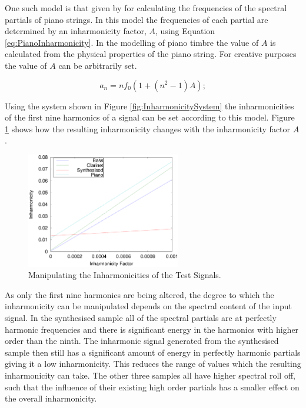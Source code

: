 			One such model is that given by \citet{rossing2002the} for calculating the frequencies of the
			spectral partials of piano strings. In this model the frequencies of each partial are determined by
			an inharmonicity factor, $A$, using Equation \ref{eq:PianoInharmonicity}. In the modelling of piano
			timbre the value of $A$ is calculated from the physical properties of the piano string. For
			creative purposes the value of $A$ can be arbitrarily set.

			\begin{equation}
				a_{n} = nf_{0} \left( 1 + \left( n^{2} - 1 \right) A \right);
				\label{eq:PianoInharmonicity}
			\end{equation}

			Using the system shown in Figure \ref{fig:InharmonicitySystem} the inharmonicities of the first
			nine harmonics of a signal can be set according to this model. Figure \ref{fig:MoveInharmonicities}
			shows how the resulting inharmonicity changes with the inharmonicity factor $A$.

			\begin{figure}[h!]
				\centering
				\includegraphics[width=0.6\textwidth]{chapter6/Images/MoveInharmonicities.eps}
				\caption{Manipulating the Inharmonicities of the Test Signals.}
				\label{fig:MoveInharmonicities}
			\end{figure}

			As only the first nine harmonics are being altered, the degree to which the inharmonicity can be
			manipulated depends on the spectral content of the input signal. In the synthesised sample all of
			the spectral partials are at perfectly harmonic frequencies and there is significant energy in the
			harmonics with higher order than the ninth. The inharmonic signal generated from the synthesised
			sample then still has a significant amount of energy in perfectly harmonic partials giving it a low
			inharmonicity. This reduces the range of values which the resulting inharmonicity can take. The
			other three samples all have higher spectral roll off, such that the influence of their existing
			high order partials has a smaller effect on the overall inharmonicity.

